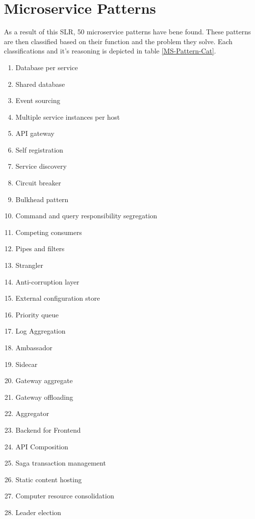 \documentclass[conference]{IEEEtran}
\begin{document}
\section{Microservice Patterns}

As a result of this SLR, 50 microservice patterns have bene found. These patterns are then classified based on their function and the problem they solve. Each classifications and it's reasoning is depicted in table \ref{MS-Pattern-Cat}.


\begin{enumerate}
    \item Database per service \checkmark
    \item Shared database \checkmark
    \item Event sourcing \checkmark
    \item Multiple service instances per host \checkmark
    \item API gateway \checkmark
    \item Self registration \checkmark
    \item Service discovery \checkmark
    \item Circuit breaker \checkmark
    \item Bulkhead pattern \checkmark
    \item Command and query responsibility segregation \checkmark
    \item Competing consumers \checkmark
    \item Pipes and filters \checkmark
    \item Strangler \checkmark
    \item Anti-corruption layer \checkmark
    \item External configuration store  \checkmark
    \item Priority queue \checkmark
    \item Log Aggregation \checkmark
    \item Ambassador \checkmark
    \item Sidecar \checkmark
    \item Gateway aggregate \checkmark
    \item Gateway offloading \checkmark
    \item Aggregator \checkmark
    \item Backend for Frontend \checkmark
    \item API Composition \checkmark
    \item Saga transaction management \checkmark
    \item Static content hosting \checkmark
    \item Computer resource consolidation \checkmark
    \item Leader election \checkmark
  \end{enumerate}
\end{document}
